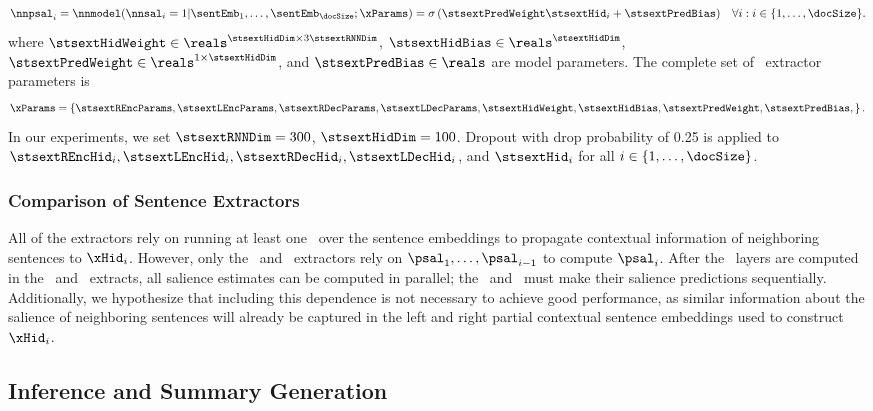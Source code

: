 \noindent{}\\[-40pt]
\begin{align}
\nnpsal_i =    \nnmodel(\nnsal_i=1|\sentEmb_1, \ldots,\sentEmb_\docSize;\xParams)& = 
            \sigma\left(\stsextPredWeight \stsextHid_i + \stsextPredBias  
            \right) &
    \forall i : i \in \{1,\ldots,\docSize\}.
\end{align}
where $\stsextHidWeight \in \reals^{\stsextHidDim \times 3\stsextRNNDim}$,
$\stsextHidBias \in \reals^{\stsextHidDim}$, 
$\stsextPredWeight \in \reals^{1 \times \stsextHidDim}$, and
$\stsextPredBias \in \reals$ are model parameters.
The complete set of \stsext~extractor parameters is 
\[\xParams = \left\{ \stsextREncParams, \stsextLEncParams,
        \stsextRDecParams, \stsextLDecParams, \stsextHidWeight, \stsextHidBias, \stsextPredWeight, \stsextPredBias, \right\}. \]
In our experiments, we set $\stsextRNNDim=300$, $\stsextHidDim=100$.  Dropout
with drop probability of 0.25 is applied to $\stsextREncHid_i,
\stsextLEncHid_i, \stsextRDecHid_i, \stsextLDecHid_i$, and $\stsextHid_i$ for
all $i \in \{1,\ldots,\docSize\}$.

\subsubsection{Comparison of Sentence Extractors}

All of the extractors rely on running at least one \gru~over the sentence
embeddings to propagate contextual information of neighboring sentences to
$\xHid_i$. However, only the \clext~and \srext~extractors rely on
$\psal_1,\ldots,\psal_{i-1}$ to compute $\psal_i$.  After the \gru~layers are
computed in the \rnnext~and \stsext~extracts, all salience estimates can be
computed in parallel; the \clext~and \srext~must make their salience
predictions sequentially.  Additionally, we hypothesize that including this
dependence is not necessary to achieve good performance, as similar
information about the salience of neighboring sentences will already be
captured in the left and right partial contextual sentence embeddings used to
construct $\xHid_i$.

\subsection{Inference and Summary Generation} \label{sec:inference}

